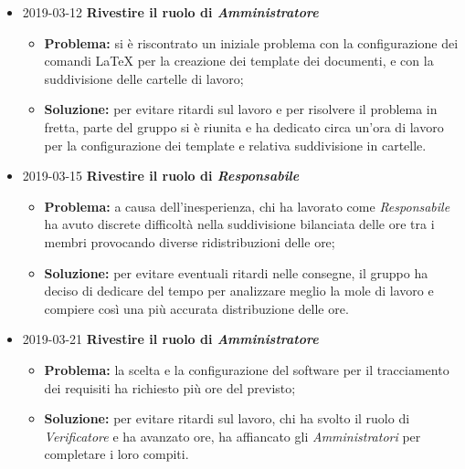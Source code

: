 \begin{itemize}

		\item 2019-03-12 \textbf{Rivestire il ruolo di \textit{Amministratore}} \\
		\begin{itemize}
			\item \textbf{Problema:} si è riscontrato un iniziale problema con la configurazione dei comandi \LaTeX{} per la creazione dei template dei documenti, e con la suddivisione delle cartelle di lavoro;
			\item \textbf{Soluzione:} per evitare ritardi sul lavoro e per risolvere il problema in fretta, parte del gruppo si è riunita e ha dedicato circa un'ora di lavoro per la configurazione dei template e relativa suddivisione in cartelle.
		\end{itemize}	
		
		\item 2019-03-15 \textbf{Rivestire il ruolo di \textit{Responsabile}} \\
		\begin{itemize}
			\item \textbf{Problema:} a causa dell'inesperienza, chi ha lavorato come \textit{Responsabile} ha avuto discrete
		difficoltà nella suddivisione bilanciata delle ore tra i membri provocando 
		diverse ridistribuzioni delle ore;
			\item \textbf{Soluzione:} per evitare eventuali ritardi nelle consegne, il gruppo ha deciso di dedicare 
		del tempo per analizzare meglio la mole di lavoro e compiere così una più
		accurata distribuzione delle ore.
		\end{itemize}
		
						
		\item 2019-03-21 \textbf{Rivestire il ruolo di \textit{Amministratore}} \\
		\begin{itemize}
			\item \textbf{Problema:} la scelta e la configurazione del software per il tracciamento dei requisiti
		ha richiesto più ore del previsto;
			\item \textbf{Soluzione:} per evitare ritardi sul lavoro, chi ha svolto il ruolo di \textit{Verificatore}
		e ha avanzato ore, ha affiancato gli \textit{Amministratori} per completare 
		i loro compiti.
		\end{itemize}
		
\end{itemize}
